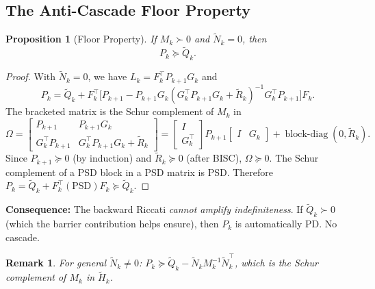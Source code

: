 \documentclass[11pt]{article}
\newtheorem{proposition}[theorem]{Proposition}
\newtheorem{remark}[theorem]{Remark}
\DeclareMathOperator{\blockdiag}{block\text{-}diag}
\begin{document}
\subsection{The Anti-Cascade Floor Property}

\begin{proposition}[Floor Property]\label{prop:floor}
If $M_k \succ 0$ and $\tilde{N}_k = 0$, then
\begin{equation}
  P_k \succeq \tilde{Q}_k.
\end{equation}
\end{proposition}

\begin{proof}
With $\tilde{N}_k = 0$, we have $L_k = F_k^\top P_{k+1} G_k$ and
\begin{equation}
  P_k = \tilde{Q}_k + F_k^\top\!\bigl[P_{k+1}
        - P_{k+1} G_k (G_k^\top P_{k+1} G_k + \tilde{R}_k)^{-1} G_k^\top P_{k+1}\bigr] F_k.
\end{equation}
The bracketed matrix is the Schur complement of $M_k$ in
\begin{equation}
  \Omega = \begin{bmatrix}
    P_{k+1} & P_{k+1} G_k \\
    G_k^\top P_{k+1} & G_k^\top P_{k+1} G_k + \tilde{R}_k
  \end{bmatrix}
  = \begin{bmatrix} I \\ G_k^\top \end{bmatrix} P_{k+1}
    \begin{bmatrix} I & G_k \end{bmatrix}
  + \blockdiag(0, \tilde{R}_k).
\end{equation}
Since $P_{k+1} \succeq 0$ (by induction) and $\tilde{R}_k \succeq 0$ (after BISC),
$\Omega \succeq 0$. The Schur complement of a PSD block in a PSD matrix is PSD.
Therefore $P_k = \tilde{Q}_k + F_k^\top(\text{PSD})F_k \succeq \tilde{Q}_k$.
\end{proof}

\textbf{Consequence:} The backward Riccati \emph{cannot amplify indefiniteness}.
If $\tilde{Q}_k \succ 0$ (which the barrier contribution helps ensure), then
$P_k$ is automatically PD. No cascade.

\begin{remark}
For general $\tilde{N}_k \ne 0$:
$P_k \succeq \tilde{Q}_k - \tilde{N}_k M_k^{-1} \tilde{N}_k^\top$,
which is the Schur complement of $M_k$ in $\tilde{H}_k$.
\end{remark}
\end{document}
